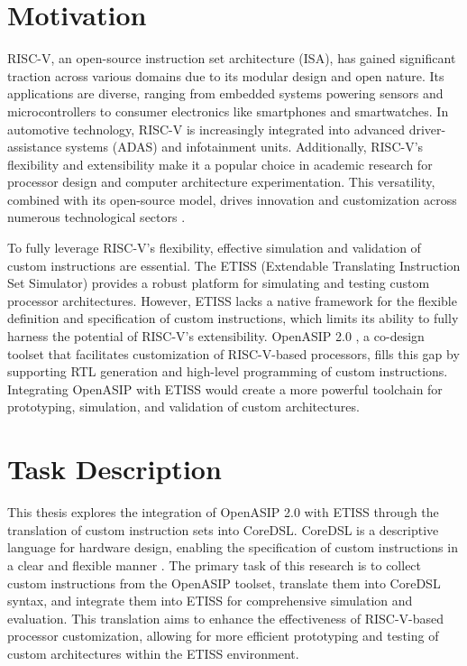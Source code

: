 \section{Motivation}
RISC-V, an open-source instruction set architecture (ISA), has gained significant traction across various domains due to its modular design and open nature. Its applications are diverse, ranging from embedded systems powering sensors and microcontrollers to consumer electronics like smartphones and smartwatches. In automotive technology, RISC-V is increasingly integrated into advanced driver-assistance systems (ADAS) and infotainment units. Additionally, RISC-V's flexibility and extensibility make it a popular choice in academic research for processor design and computer architecture experimentation. This versatility, combined with its open-source model, drives innovation and customization across numerous technological sectors \cite{Risc-v}.

To fully leverage RISC-V's flexibility, effective simulation and validation of custom instructions are essential. The ETISS (Extendable Translating Instruction Set Simulator) \cite{ETISS} provides a robust platform for simulating and testing custom processor architectures. However, ETISS lacks a native framework for the flexible definition and specification of custom instructions, which limits its ability to fully harness the potential of RISC-V's extensibility. OpenASIP 2.0 \cite{OpenASIP}, a co-design toolset that facilitates customization of RISC-V-based processors, fills this gap by supporting RTL generation and high-level programming of custom instructions. Integrating OpenASIP with ETISS would create a more powerful toolchain for prototyping, simulation, and validation of custom architectures.

\section{Task Description}
This thesis explores the integration of OpenASIP 2.0 with ETISS through the translation of custom instruction sets into CoreDSL. CoreDSL is a descriptive language for hardware design, enabling the specification of custom instructions in a clear and flexible manner \cite{CoreDSL}. The primary task of this research is to collect custom instructions from the OpenASIP toolset, translate them into CoreDSL syntax, and integrate them into ETISS for comprehensive simulation and evaluation. This translation aims to enhance the effectiveness of RISC-V-based processor customization, allowing for more efficient prototyping and testing of custom architectures within the ETISS environment.

